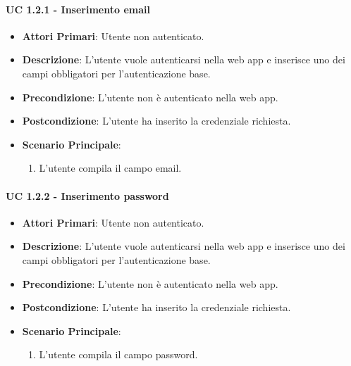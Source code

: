			\paragraph{UC 1.2.1 - Inserimento email}
			\begin{itemize}
				\item \textbf{Attori Primari}: Utente non autenticato.
				\item \textbf{Descrizione}: L'utente vuole autenticarsi nella web app e inserisce uno dei campi obbligatori per l'autenticazione base.
				\item \textbf{Precondizione}: L'utente non è autenticato nella web app.
				\item \textbf{Postcondizione}: L'utente ha inserito la credenziale richiesta.
				\item \textbf{Scenario Principale}:
				\begin{enumerate}
					\item L'utente compila il campo email.
				\end{enumerate}	
			\end{itemize}

			\paragraph{UC 1.2.2 - Inserimento password}
			\begin{itemize}
				\item \textbf{Attori Primari}: Utente non autenticato.
				\item \textbf{Descrizione}: L'utente vuole autenticarsi nella web app e inserisce uno dei campi obbligatori per l'autenticazione base.
				\item \textbf{Precondizione}: L'utente non è autenticato nella web app.
				\item \textbf{Postcondizione}: L'utente ha inserito la credenziale richiesta.
				\item \textbf{Scenario Principale}:
				\begin{enumerate}
					\item L'utente compila il campo password.
				\end{enumerate}	
			\end{itemize}

